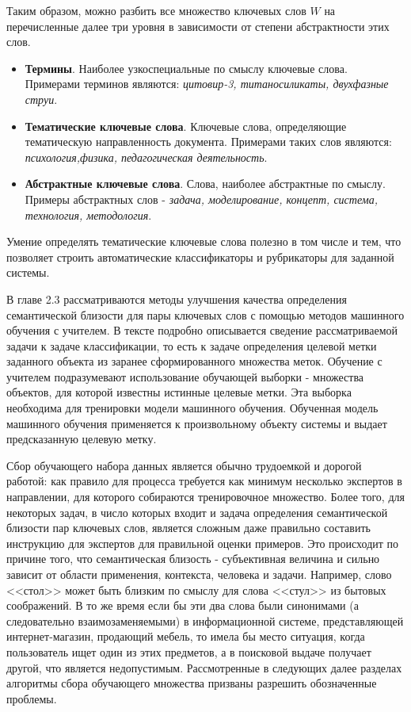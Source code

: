 Таким образом, можно разбить все множество ключевых слов $W$ на перечисленные далее три уровня в зависимости от степени абстрактности этих слов.
\begin{itemize}
    \item \textbf{Термины}. Наиболее узкоспециальные по смыслу ключевые слова. Примерами терминов являются: \emph{цитовир-3, титаносиликаты, двухфазные струи}.
    \item \textbf{Тематические ключевые слова}. Ключевые слова, определяющие тематическую направленность документа. Примерами таких слов являются: \emph{психология,физика, педагогическая деятельность}.
    \item \textbf{Абстрактные ключевые слова}. Слова, наиболее абстрактные по смыслу. Примеры абстрактных слов - \emph{задача, моделирование, концепт, система, технология, методология}.
\end{itemize}

Умение определять тематические ключевые слова полезно в том числе и тем, что позволяет строить автоматические классификаторы и рубрикаторы для заданной системы.

В главе 2.3 рассматриваются методы улучшения качества определения семантической близости для пары ключевых слов с помощью методов машинного обучения с учителем. В тексте подробно описывается сведение рассматриваемой задачи к задаче классификации, то есть к задаче определения целевой метки заданного объекта из заранее сформированного множества меток. Обучение с учителем подразумевают использование обучающей выборки - множества объектов, для которой известны истинные целевые метки. Эта выборка необходима для тренировки модели машинного обучения. Обученная модель машинного обучения применяется к произвольному объекту системы и выдает предсказанную целевую метку.

Сбор обучающего набора данных является обычно трудоемкой и дорогой работой: как правило для процесса требуется как минимум несколько экспертов в направлении, для которого собираются тренировочное множество. Более того, для некоторых задач, в число которых входит и задача определения семантической близости пар ключевых слов, является сложным даже правильно составить инструкцию для экспертов для правильной оценки примеров. Это происходит по причине того, что семантическая близость - субъективная величина и сильно зависит от области применения, контекста, человека и задачи. Например, слово <<стол>> может быть близким по смыслу для слова <<стул>> из бытовых соображений. В то же время если бы эти два слова были синонимами (а следовательно взаимозаменяемыми) в информационной системе, представляющей интернет-магазин, продающий мебель, то имела бы место ситуация, когда пользователь ищет один из этих предметов, а в поисковой выдаче получает другой, что является недопустимым. Рассмотренные в следующих далее разделах алгоритмы сбора обучающего множества призваны разрешить обозначенные проблемы.

